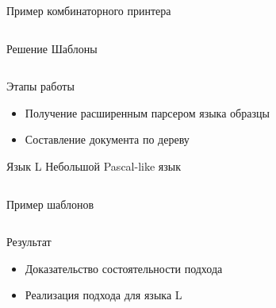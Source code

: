 \documentclass{beamer}
\begin{document}
\begin{frame}{Пример комбинаторного принтера}
	\inputminted{haskell}{codes/lHughesPrinter.hs}
\end{frame}

\begin{frame}{Решение}
	Шаблоны
	\begin{block}{}
		\inputminted{pascal}{codes/l_write.t}
	\end{block}
\end{frame}


\begin{frame}{Этапы работы}
	\begin{itemize}
		\item Получение расширенным парсером языка образцы
		\item Составление документа по дереву
	\end{itemize}
\end{frame}

\begin{frame}{Язык L}
	Небольшой Pascal-like язык
	\vspace{1cm}
	\begin{block}{}
		\inputminted{c}{codes/pow.l}
	\end{block}
\end{frame}

\begin{frame}{Пример шаблонов}
	\begin{block}{}
		\inputminted{pascal}{codes/l_while.t}
	\end{block}
\end{frame}

\begin{frame}{Результат}
	\begin{itemize}
		\item Доказательство состоятельности подхода
		\item Реализация подхода для языка L
	\end{itemize}
\end{frame}
\end{document}
